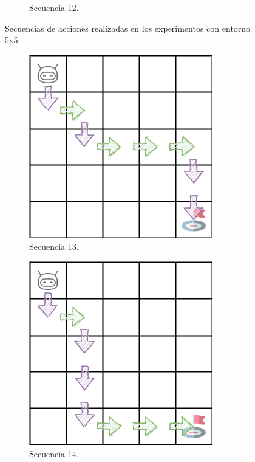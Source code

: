 \begin{figure}
\begin{subfigure}{.35\textwidth}
        \caption{Secuencia 12.}
        \label{fig:seq12}
    \end{subfigure}
    \caption{Secuencias de acciones realizadas en los experimentos con entorno 5x5.}
    \label{fig:dim5_sequences}
\end{figure}

\begin{figure}{
    \ContinuedFloat
    \begin{subfigure}{.35\textwidth}
        \centering
        \includegraphics[scale=0.4]{cap5_experimentacion/images/dim5_lr0.01_ep0.9_383.png}
        \caption{Secuencia 13.}
        \label{fig:seq13}
    \end{subfigure}%
    \begin{subfigure}{.35\textwidth}
        \centering
        \includegraphics[scale=0.4]{cap5_experimentacion/images/dim5_actions_29.png}
        \caption{Secuencia 14.}
        \label{fig:seq14}
    \end{subfigure}%
    \begin{subfigure}{.35\textwidth}

\end{subfigure}}
\end{figure}
